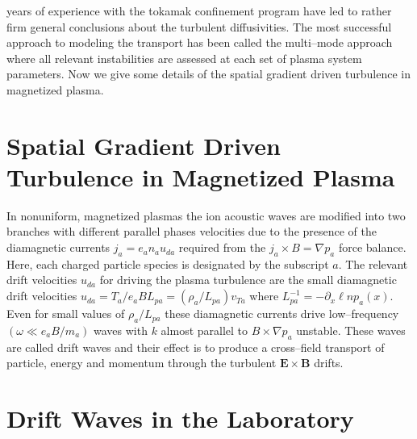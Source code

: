 \documentclass[a4paper,openany,12pt]{book}
\begin{document}
years of experience with the tokamak confinement program have led to rather firm general conclusions about the turbulent diffusivities. The most successful approach to modeling the transport has been called the multi--mode approach where all relevant instabilities are assessed at each set of plasma system parameters. Now we give some details of the spatial gradient driven turbulence in magnetized plasma.

\section{Spatial Gradient Driven Turbulence in Magnetized Plasma}

In nonuniform, magnetized plasmas the ion acoustic waves are modified into two branches with different parallel phases velocities due to the presence of the diamagnetic currents 
$j_a =e_a n_a u_{da}$ required from the $j_a \times B=\nabla p_a $ force balance. Here, each charged particle species is designated by the subscript $a$. The relevant drift velocities $u_{da}$ for driving the plasma turbulence are the small diamagnetic drift velocities $u_{da}=T_a /e_a BL_{pa}=(\rho_a /L_{pa})v_{Ta}$ where $L_{pa}^{-1}=-\partial_x\ell np_a (x)$. Even for small values of $\rho_a /L_{pa}$ these diamagnetic currents drive low--frequency $(\omega\ll e_a B/m_a)$ waves with $k$ almost parallel to $B\times\nabla p_a $ unstable. These waves are called drift waves and their effect is to produce a cross--field transport of particle, energy and momentum through the turbulent $\bm{E\times B}$ drifts.

\section{Drift Waves in the Laboratory}
\end{document}
